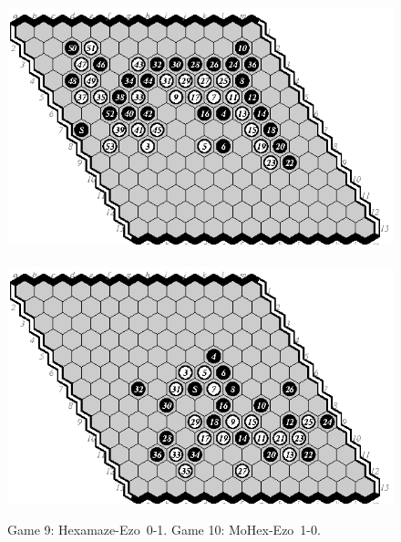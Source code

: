 \documentclass{icga}
\def\Eo{\mbox{\sc Ezo}}
\def\Hz{\mbox{\sc Hexamaze}}
\def\Mx{\mbox{\sc MoHex}}
\begin{document}
\begin{figure}[hbp]
\includegraphics[scale=1.2]{games/pix/13-09-he-0-1.eps}\hspace*{-1cm}\
\includegraphics[scale=1.2]{games/pix/13-10-me-1-0.eps}
\caption{Game 9: \Hz-\Eo\ 0-1. Game 10: \Mx-\Eo\ 1-0.}
\end{figure}
\end{document}
